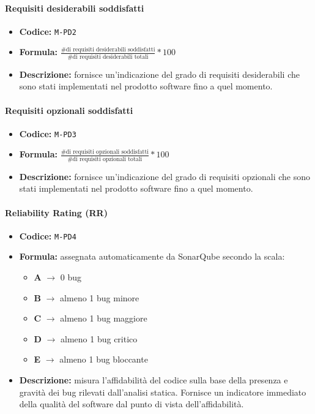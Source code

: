 \documentclass[a4paper,12pt]{article}
\begin{document}
\paragraph{Requisiti desiderabili soddisfatti}
\begin{itemize}
    \item \textbf{Codice:} \texttt{M-PD2} 
    \item \textbf{Formula:} $\frac{\text{\# di requisiti desiderabili soddisfatti}}{\text{\# di requisiti desiderabili totali}}*100$
    \item \textbf{Descrizione:} fornisce un'indicazione del grado di requisiti desiderabili che sono stati implementati nel prodotto software fino a quel momento.
\end{itemize}

\paragraph{Requisiti opzionali soddisfatti}
\begin{itemize}
    \item \textbf{Codice:} \texttt{M-PD3} 
    \item \textbf{Formula:} $\frac{\text{\# di requisiti opzionali soddisfatti}}{\text{\# di requisiti opzionali totali}}*100$
    \item \textbf{Descrizione:} fornisce un'indicazione del grado di requisiti opzionali che sono stati implementati nel prodotto software fino a quel momento. 
\end{itemize}

\paragraph{Reliability Rating (RR)}
\begin{itemize}
\item \textbf{Codice:} \texttt{M-PD4}
\item \textbf{Formula:} assegnata automaticamente da SonarQube secondo la scala:
\begin{itemize}
    \item \textbf{A} $\rightarrow$ 0 bug
    \item \textbf{B} $\rightarrow$ almeno 1 bug minore
    \item \textbf{C} $\rightarrow$ almeno 1 bug maggiore
    \item \textbf{D} $\rightarrow$ almeno 1 bug critico
    \item \textbf{E} $\rightarrow$ almeno 1 bug bloccante
\end{itemize}
\item \textbf{Descrizione:} misura l'affidabilità del codice sulla base della presenza 
e gravità dei bug rilevati dall'analisi statica. Fornisce un indicatore immediato della qualità 
del software dal punto di vista dell'affidabilità.
\end{itemize}
\end{document}
